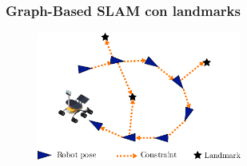 \begin{frame}
    \frametitle{Graph-Based SLAM con landmarks}
    
       \begin{figure}[!h]
        \includegraphics[width=0.6\textwidth]{images/pose_landmark_graph_example.pdf}
    \end{figure}
    
\end{frame}

